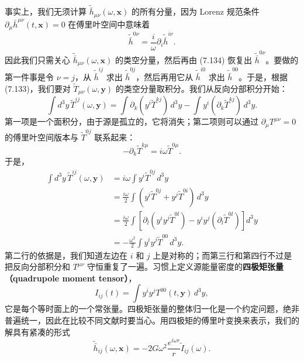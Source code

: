 事实上，我们无须计算 $\widetilde{\bar{h}}_{\mu\nu}(\omega, \mathbf{x})$ 的所有分量，因为 Lorenz 规范条件 $\partial_\mu\bar{h}^{\mu\nu}(t, \mathbf{x}) = 0$ 在傅里叶空间中意味着
\begin{equation*}
\widetilde{\bar{h}}^{0\nu} = \frac{i}{\omega}\partial_i\widetilde{\bar{h}}^{i\nu}.
\tag{7.134}
\end{equation*}
因此我们只需关心 $\widetilde{\bar{h}}_{\mu\nu}(\omega, \mathbf{x})$ 的类空分量，然后再由 (7.134) 恢复出 $\widetilde{\bar{h}}^{0\nu}$。要做的第一件事是令 $\nu = j$，从 $\widetilde{\bar{h}}^{ij}$ 求出 $\widetilde{\bar{h}}^{0j}$，然后再用它从 $\widetilde{\bar{h}}^{i0}$ 求出 $\widetilde{\bar{h}}^{00}$。于是，根据 (7.133)，我们要对 $\widetilde{T}_{\mu\nu}(\omega, \mathbf{y})$ 的类空分量取积分。我们从反向分部积分开始：
\begin{equation*}
\int d^{3}y\, \widetilde{T}^{ij}(\omega, \mathbf{y}) = \int \partial_k(y^{i}\widetilde{T}^{kj})\, d^{3}y - \int y^{i}(\partial_k\widetilde{T}^{kj})\, d^{3}y.
\tag{7.135}
\end{equation*}
第一项是一个面积分，由于源是孤立的，它将消失；第二项则可以通过 $\partial_\mu T^{\mu\nu} = 0$ 的傅里叶空间版本与 $\widetilde{T}^{0j}$ 联系起来：
\begin{equation*}
-\partial_k\widetilde{T}^{k\mu} = i\omega\widetilde{T}^{0\mu}.
\tag{7.136}
\end{equation*}
于是，
\begin{align*}
\int d^{3}y\, \widetilde{T}^{ij}(\omega, \mathbf{y}) &= i\omega\int y^{i}\widetilde{T}^{0j}\, d^{3}y \\
&= \frac{i\omega}{2}\int (y^{i}\widetilde{T}^{0j} + y^{j}\widetilde{T}^{0i})\, d^{3}y \\
&= \frac{i\omega}{2}\int \left[\partial_l(y^{i}y^{j}\widetilde{T}^{0l}) - y^{i}y^{j}(\partial_l\widetilde{T}^{0l})\right] d^{3}y \\
&= -\frac{\omega^{2}}{2}\int y^{i}y^{j}\widetilde{T}^{00}\, d^{3}y.
\tag{7.137}
\end{align*}
第二行的依据是，我们知道左边在 $i$ 和 $j$ 上是对称的；而第三行和第四行不过是把反向分部积分和 $T^{\mu\nu}$ 守恒重复了一遍。习惯上定义源能量密度的\textbf{四极矩张量（quadrupole moment tensor）}，
\begin{equation*}
I_{ij}(t) = \int y^{i}y^{j}T^{00}(t, \mathbf{y})\, d^{3}y,
\tag{7.138}
\end{equation*}
它是每个等时面上的一个常张量。四极矩张量的整体归一化是一个约定问题，绝非普遍统一，因此在比较不同文献时要当心。用四极矩的傅里叶变换来表示，我们的解具有紧凑的形式
\begin{equation*}
\widetilde{\bar{h}}_{ij}(\omega, \mathbf{x}) = -2G\omega^{2}\frac{e^{i\omega r}}{r}\widetilde{I}_{ij}(\omega).
\tag{7.139}
\end{equation*}

